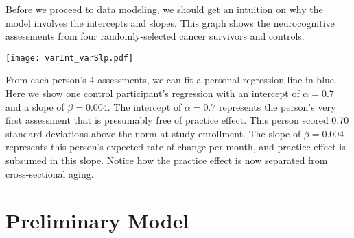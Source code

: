 \documentclass{article}
\begin{document}
Before we proceed to data modeling, we should get an
intuition on why the model involves the intercepts and
slopes. This graph shows the neurocognitive assessments
from four randomly-selected cancer survivors and 
controls. 
\begin{center}
\texttt{[image: varInt\_varSlp.pdf]}
\end{center} 
From each person's 4 assessments, we can fit a personal
regression line in blue.  Here we show one control participant's
regression with an intercept of $\alpha = 0.7$ and a
slope of $\beta=0.004$.  The intercept of $\alpha = 0.7$
represents the person's very first assessment that is
presumably free of practice effect.  This person scored 0.70
standard deviations above the norm at study enrollment.
The slope of $\beta = 0.004$
represents this person's expected rate of change per month, and
practice effect is subsumed in this slope.  Notice how the
practice effect is now separated from 
cross-sectional aging.

\section{Preliminary Model}
\end{document}
